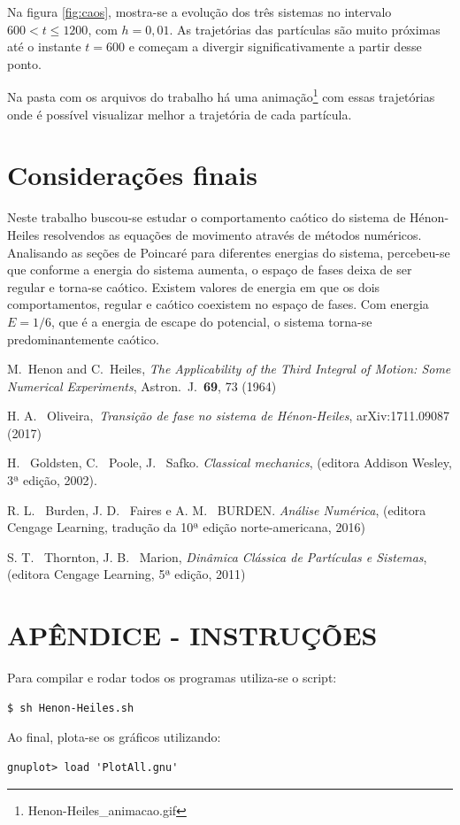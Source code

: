 \documentclass[brazilian, 10pt, a4paper, final]{article}
\begin{document}
\begin{multicols*}{2}
Na figura \ref{fig:caos}, mostra-se a evolução dos três sistemas no intervalo $600 < t \le 1200$, com $h=0,01$.  As trajetórias das partículas são muito próximas até o instante $t=600$ e começam a divergir significativamente a partir desse ponto.


Na pasta com os arquivos do trabalho há uma animação\footnote{Henon-Heiles\_animacao.gif} com essas trajetórias onde é possível visualizar melhor a trajetória de cada partícula.

\section{Considerações finais}

Neste trabalho buscou-se estudar o comportamento caótico do sistema de Hénon-Heiles resolvendos as equações de movimento através de métodos numéricos. Analisando as seções de Poincaré para diferentes energias do sistema, percebeu-se que conforme a energia do sistema aumenta, o espaço de fases deixa de ser regular e torna-se caótico. Existem valores de energia em que os dois comportamentos, regular e caótico coexistem no espaço de fases. Com energia $E=1/6$, que é a energia de escape do potencial, o sistema torna-se predominantemente caótico.

\begin{thebibliography}{n}
  M.~Henon and C.~Heiles,
  {\em The Applicability of the Third Integral of Motion: Some Numerical Experiments},
  Astron.\ J.\  {\bf 69}, 73 (1964)

  
 H. A. ~Oliveira,\ {\em Transição de fase no sistema de Hénon-Heiles}, arXiv:1711.09087 (2017) 
  
 H. ~Goldsten, C. ~Poole, J. ~Safko. {\em Classical mechanics}, (editora Addison Wesley, 3ª edição, 2002).
  
 R. L. ~Burden, J. D. ~Faires e A. M. ~BURDEN. {\em Análise Numérica}, (editora Cengage Learning,  tradução da 10ª edição norte-americana, 2016)
  
 S. T. ~Thornton, J. B. ~Marion, {\em Dinâmica Clássica de Partículas e Sistemas}, (editora Cengage Learning, 5ª edição, 2011)
  
\end{thebibliography}

\end{multicols*}

\appendix
\section{APÊNDICE - INSTRUÇÕES}

Para compilar e rodar todos os programas utiliza-se o script:
\begin{verbatim}
$ sh Henon-Heiles.sh
\end{verbatim}

Ao final, plota-se os gráficos utilizando:
\begin{verbatim}
gnuplot> load 'PlotAll.gnu'
\end{verbatim}
\end{document}
